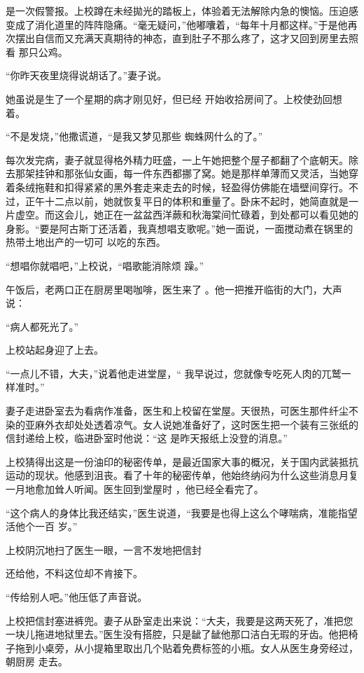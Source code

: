 \documentclass{article}
\begin{document}
是一次假警报。上校蹲在未经拋光的踏板上，体验着无法解除内急的懊恼。压迫感变成了消化道里的阵阵隐痛。“毫无疑问，”他嘟囔着，“每年十月都这样。”于是他再次摆出自信而又充满天真期待的神态，直到肚子不那么疼了，这才又回到房里去照看
那只公鸡。 


“你昨天夜里烧得说胡话了。”妻子说。 

她虽说是生了一个星期的病才刚见好，但已经
开始收拾房间了。上校使劲回想着。 

“不是发烧，”他撒谎道，“是我又梦见那些
蜘蛛网什么的了。” 

\newpage

每次发完病，妻子就显得格外精力旺盛，一上午她把整个屋子都翻了个底朝天。除去那架挂钟和那张仙女画，每一件东西都挪了窝。她是那样单薄而又灵活，当她穿着条绒拖鞋和扣得紧紧的黑外套走来走去的时候，轻盈得仿佛能在墙壁间穿行。不过，正午十二点以前，她就恢复平日的体积和重量了。卧床不起时，她简直就是一片虚空。而这会儿，她正在一盆盆西洋蕨和秋海棠间忙碌着，到处都可以看见她的身影。“要是阿古斯丁还活着，我真想唱支歌呢。”她一面说，一面搅动煮在锅里的热带土地出产的一切可
以吃的东西。 

“想唱你就唱吧，”上校说，“唱歌能消除烦
躁。” 

午饭后，老两口正在厨房里喝咖啡，医生来了
。他一把推开临街的大门，大声说： 


“病人都死光了。” 


\newpage

上校站起身迎了上去。 

“一点儿不错，大夫，”说着他走进堂屋，“
我早说过，您就像专吃死人肉的兀鹫一样准时。” 

妻子走进卧室去为看病作准备，医生和上校留在堂屋。天很热，可医生那件纤尘不染的亚麻外衣却处处透着凉气。女人说她准备好了，这时医生把一个装有三张纸的信封递给上校，临进卧室时他说：“这
是昨天报纸上没登的消息。” 

上校猜得出这是一份油印的秘密传单，是最近国家大事的概况，关于国内武装抵抗运动的现状。他感到沮丧。看了十年的秘密传单，他始终纳闷为什么这些消息月复一月地愈加耸人听闻。医生回到堂屋时
，他已经全看完了。 

“这个病人的身体比我还结实，”医生说道，“我要是也得上这么个哮喘病，准能指望活他个一百
岁。” 

上校阴沉地扫了医生一眼，一言不发地把信封
\newpage

还给他，不料这位却不肯接下。 


“传给别人吧。”他压低了声音说。 

上校把信封塞进裤兜。妻子从卧室走出来说：“大夫，我要是这两天死了，准把您一块儿拖进地狱里去。”医生没有搭腔，只是龇了龇他那口洁白无瑕的牙齿。他把椅子拖到小桌旁，从小提箱里取出几个贴着免费标签的小瓶。女人从医生身旁经过，朝厨房
走去。 
\end{document}
